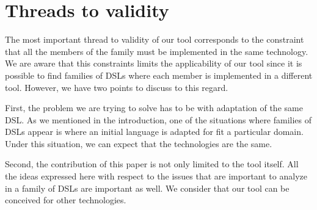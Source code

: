 \section{Threads to validity}
\label{sec:threadstovalidity}

The most important thread to validity of our tool corresponds to the constraint that all the members of the family must be implemented in the same technology. We are aware that this constraints limits the applicability of our tool since it is possible to find families of DSLs where each member is implemented in a different tool. However, we have two points to discuss to this regard.

First, the problem we are trying to solve has to be with adaptation of the same DSL. As we mentioned in the introduction, one of the situations where families of DSLs appear is where an initial language is adapted for fit a particular domain. Under this situation, we can expect that the technologies are the same. 

Second, the contribution of this paper is not only limited to the tool itself. All the ideas expressed here with respect to the issues that are important to analyze in a family of DSLs are important as well. We consider that our tool can be conceived for other technologies. 